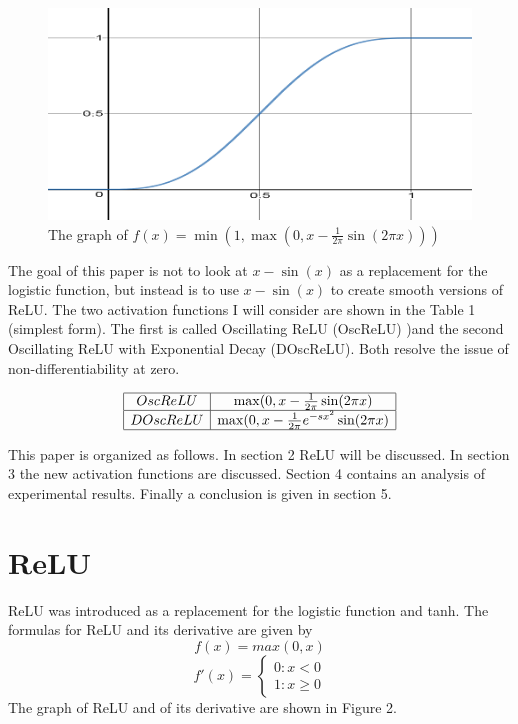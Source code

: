 \documentclass{amsart}
\theoremstyle{definition}
\theoremstyle{remark}
\numberwithin{equation}{section}
\newcommand{\blankbox}[2]{%
  \parbox{\columnwidth}{\centering
    \setlength{\fboxsep}{0pt}%
    \fbox{\raisebox{0pt}[#2]{\hspace{#1}}}%
  }%
}
\begin{document}
\begin{figure}[tb]
\includegraphics[1]{xsinx.png}
\caption{The graph of $f(x) = \min(1, \max(0, x - \frac{1}{2\pi}\sin(2\pi x)))$}
\label{Figure 1}
\end{figure}  

The goal of this paper is not to look at $x-\sin(x)$ as a replacement for the logistic function, but instead is to use $x-\sin(x)$ to create smooth versions of ReLU.   The two activation functions I will consider are shown in the Table 1 (simplest form).  The first is called Oscillating ReLU (OscReLU) )and the second Oscillating ReLU with Exponential Decay (DOscReLU). Both resolve the issue of non-differentiability at zero. 

\begin{table}[!h]
\renewcommand\arraystretch{1.5}
\noindent\[
\begin{array}{|c|c|}
\hline
OscReLU & \max(0, x - \frac{1}{2\pi}\sin(2\pi x)\\
\hline
DOscReLU & \max(0, x - \frac{1}{2\pi}e^{-sx^2}\sin(2\pi x)\\
\hline
\end{array}
\]
\end{table}

This paper is organized as follows. In section 2 ReLU will be discussed. In section 3 the new activation functions are discussed. Section 4 contains an analysis of experimental results.  Finally a conclusion is given in section 5.  

\section{ReLU}  

ReLU was introduced as a replacement for the logistic function and tanh. The formulas for ReLU and its derivative are given by $$f(x) = max(0, x)$$ $$f'(x) = \begin{cases}0 : x < 0 \\ 1 : x \geq 0 \end{cases}$$ The graph of ReLU and of its derivative are shown in Figure 2.  
\end{document}
